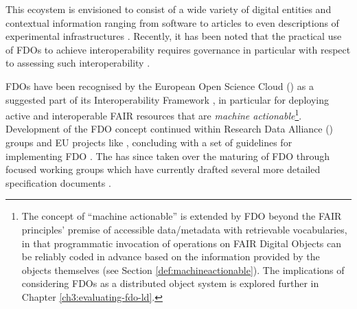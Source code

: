 This ecoystem is envisioned to consist of a wide variety of digital entities and contextual information ranging from software to articles to even descriptions of experimental infrastructures \cite{Azeroual 2022}.
Recently, it has been noted that the practical use of FDOs to achieve interoperability requires governance in particular with respect to assessing such interoperability \cite{Wilkinson 2023a}.

FDOs have been recognised by the European Open Science Cloud () as a suggested part of its Interoperability Framework \cite{Kurowski 2021}, in particular for deploying active and interoperable FAIR resources that are \emph{machine actionable}\footnote{
  The concept of ``machine actionable'' is extended by FDO beyond the FAIR principles' premise of accessible data/metadata with retrievable vocabularies, in that programmatic invocation of operations on FAIR Digital Objects can be reliably coded in advance based on the information provided by the objects themselves (see Section \vref{def:machineactionable}).
  The implications of considering FDOs as a distributed object system is explored further in Chapter \vref{ch3:evaluating-fdo-ld}.
}. Development of the FDO concept continued within Research Data Alliance () groups and EU projects like , concluding with a set of guidelines for implementing FDO \cite{Bonino 2019}. The  has since taken over the maturing of FDO through focused working groups which have currently drafted several more detailed specification documents \cite{FDO Specs}.


